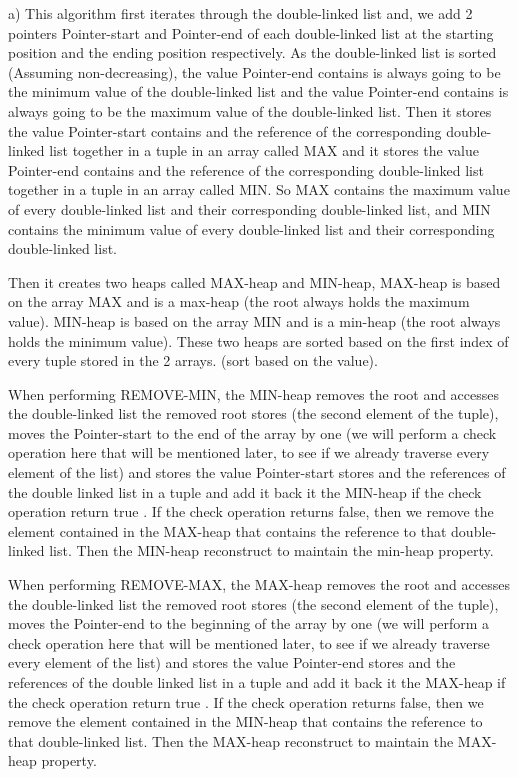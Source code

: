 \documentclass[12pt]{article}
\begin{document}
a)
This algorithm first iterates through the double-linked list and, we add 2 pointers Pointer-start and Pointer-end of each double-linked list at the starting position and the ending position respectively. As the double-linked list is sorted (Assuming non-decreasing), the value Pointer-end contains is always going to be the minimum value of the double-linked list and the value Pointer-end contains is always going to be the maximum value of the double-linked list. Then it stores the value Pointer-start contains and the reference of the corresponding double-linked list together in a tuple in an array called MAX and it stores the value Pointer-end contains and the reference of the corresponding double-linked list together in a tuple in an array called MIN. So MAX contains the maximum value of every double-linked list and their corresponding double-linked list, and MIN contains the minimum value of every double-linked list and their corresponding double-linked list.

Then it creates two heaps called MAX-heap and MIN-heap, MAX-heap is based on the array MAX and is a max-heap (the root always holds the maximum value). MIN-heap is based on the array MIN and is a min-heap (the root always holds the minimum value). These two heaps are sorted based on the first index of every tuple stored in the 2 arrays. (sort based on the value).

When performing REMOVE-MIN, the MIN-heap removes the root and accesses the double-linked list the removed root stores (the second element of the tuple), moves the Pointer-start to the end of the array by one (we will perform a check operation here that will be mentioned later, to see if we already traverse every element of the list) and stores the value Pointer-start stores and the references of the double linked list in a tuple and add it back it the MIN-heap if the check operation return true . If the check operation returns false, then we remove the element contained in the MAX-heap that contains the reference to that double-linked list. Then the MIN-heap reconstruct to maintain the min-heap property.

When performing REMOVE-MAX, the MAX-heap removes the root and accesses the double-linked list the removed root stores (the second element of the tuple), moves the Pointer-end to the beginning of the array by one (we will perform a check operation here that will be mentioned later, to see if we already traverse every element of the list) and stores the value Pointer-end stores and the references of the double linked list in a tuple and add it back it the MAX-heap if the check operation return true . If the check operation returns false, then we remove the element contained in the MIN-heap that contains the reference to that double-linked list. Then the MAX-heap reconstruct to maintain the MAX-heap property.
\end{document}
